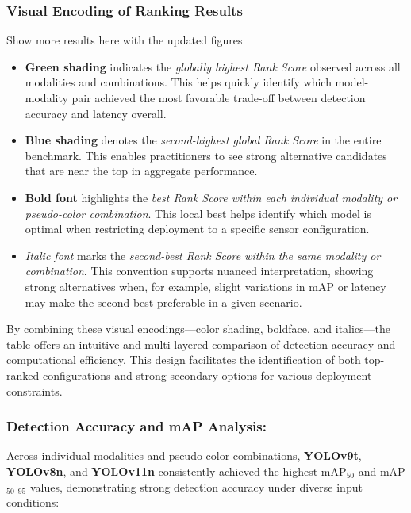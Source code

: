 \documentclass[runningheads]{llncs}
\begin{document}
\subsubsection{Visual Encoding of Ranking Results}

Show more results here with the updated figures

\begin{itemize}
    \item {}\textbf{Green shading} indicates the \emph{globally highest Rank Score} observed across all modalities and combinations. This helps quickly identify which model-modality pair achieved the most favorable trade-off between detection accuracy and latency overall.
    \item {}\textbf{Blue shading} denotes the \emph{second-highest global Rank Score} in the entire benchmark. This enables practitioners to see strong alternative candidates that are near the top in aggregate performance.
    \item \textbf{Bold font} highlights the \emph{best Rank Score within each individual modality or pseudo-color combination}. This local best helps identify which model is optimal when restricting deployment to a specific sensor configuration.
    \item \textit{Italic font} marks the \emph{second-best Rank Score within the same modality or combination}. This convention supports nuanced interpretation, showing strong alternatives when, for example, slight variations in mAP or latency may make the second-best preferable in a given scenario.
\end{itemize}

By combining these visual encodings—color shading, boldface, and italics—the table offers an intuitive and multi-layered comparison of detection accuracy and computational efficiency. This design facilitates the identification of both top-ranked configurations and strong secondary options for various deployment constraints.

\subsubsection{Detection Accuracy and mAP Analysis:}


Across individual modalities and pseudo-color combinations, \textbf{YOLOv9t}, \textbf{YOLOv8n}, and \textbf{YOLOv11n} consistently achieved the highest mAP$_{50}$ and mAP$_{50\text{--}95}$ values, demonstrating strong detection accuracy under diverse input conditions:
\end{document}
